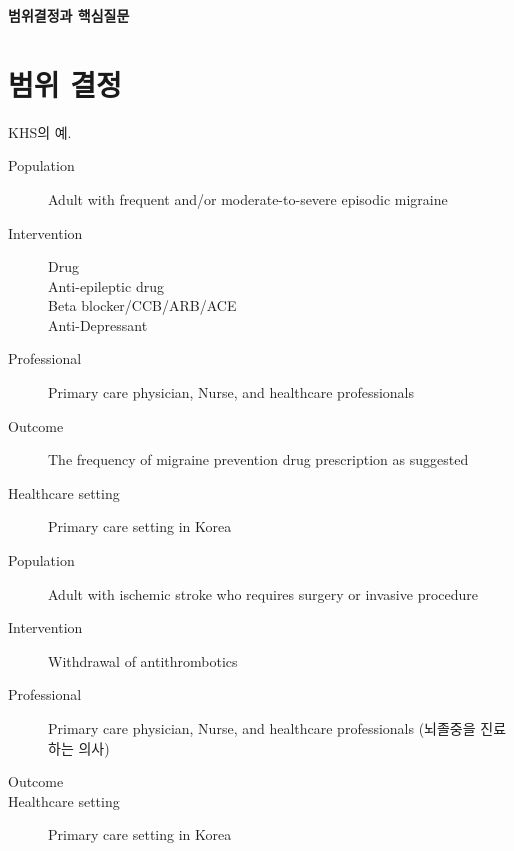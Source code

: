 \documentclass{paper}
\begin{document}
\Large \textbf{범위결정과 핵심질문} \normalsize

\section{범위 결정}
\color{blue}
KHS의 예.
\begin{description}
	\item[Population] Adult with frequent and/or moderate-to-severe episodic migraine 
	\item[Intervention] Drug \\Anti-epileptic drug\\Beta blocker/CCB/ARB/ACE\\Anti-Depressant
	\item[Professional] Primary care physician, Nurse, and healthcare professionals
	\item[Outcome] The frequency of migraine prevention drug prescription as suggested
	\item[Healthcare setting] Primary care setting in Korea
\end{description}
\color{black}

\begin{description}
	\item[Population] Adult with ischemic stroke who requires surgery or invasive procedure		
	\item[Intervention] Withdrawal of antithrombotics
	\item[Professional] Primary care physician, Nurse, and healthcare professionals (뇌졸중을 진료하는 의사)
	\item[Outcome] 
	\item[Healthcare setting] Primary care setting in Korea
\end{description}

\newpage
\end{document}
